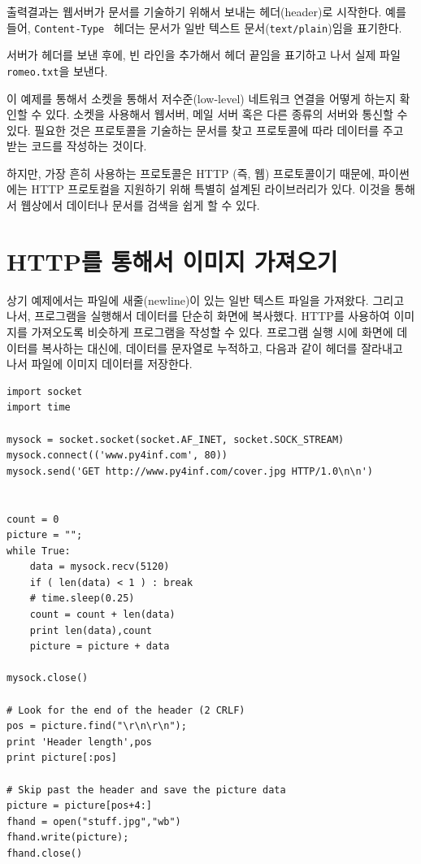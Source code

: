 출력결과는 웹서버가 문서를 기술하기 위해서 보내는 헤더(header)로 시작한다.
예를 들어, {\tt Content-Type } 헤더는 문서가 일반 텍스트 문서({\tt text/plain})임을 표기한다.

서버가 헤더를 보낸 후에, 빈 라인을 추가해서 헤더 끝임을 표기하고 나서 실제 파일{\tt romeo.txt}을 보낸다.

이 예제를 통해서 소켓을 통해서 저수준(low-level) 네트워크 연결을 어떻게 하는지 확인할 수 있다.
소켓을 사용해서 웹서버, 메일 서버 혹은 다른 종류의 서버와 통신할 수 있다.
필요한 것은 프로토콜을 기술하는 문서를 찾고 프로토콜에 따라 데이터를 주고 받는 코드를 작성하는 것이다.

하지만, 가장 흔히 사용하는 프로토콜은 HTTP (즉, 웹) 프로토콜이기 때문에, 
파이썬에는 HTTP 프로토컬을 지원하기 위해 특별히 설계된 라이브러리가 있다.
이것을 통해서 웹상에서 데이터나 문서를 검색을 쉽게 할 수 있다.

\section{HTTP를 통해서 이미지 가져오기}


상기 예제에서는 파일에 새줄(newline)이 있는 일반 텍스트 파일을 가져왔다. 
그리고 나서, 프로그램을 실행해서 데이터를 단순히 화면에 복사했다.
HTTP를 사용하여 이미지를 가져오도록 비슷하게 프로그램을 작성할 수 있다. 
프로그램 실행 시에 화면에 데이터를 복사하는 대신에,
데이터를 문자열로 누적하고, 다음과 같이 헤더를 잘라내고 나서 파일에 이미지 데이터를 저장한다. 

\beforeverb
\begin{verbatim}
import socket
import time

mysock = socket.socket(socket.AF_INET, socket.SOCK_STREAM)
mysock.connect(('www.py4inf.com', 80))
mysock.send('GET http://www.py4inf.com/cover.jpg HTTP/1.0\n\n')


count = 0
picture = "";
while True:
    data = mysock.recv(5120)
    if ( len(data) < 1 ) : break
    # time.sleep(0.25)
    count = count + len(data)
    print len(data),count
    picture = picture + data

mysock.close()

# Look for the end of the header (2 CRLF)
pos = picture.find("\r\n\r\n");
print 'Header length',pos
print picture[:pos]

# Skip past the header and save the picture data
picture = picture[pos+4:]
fhand = open("stuff.jpg","wb")
fhand.write(picture);
fhand.close()
\end{verbatim}
\afterverb
%

